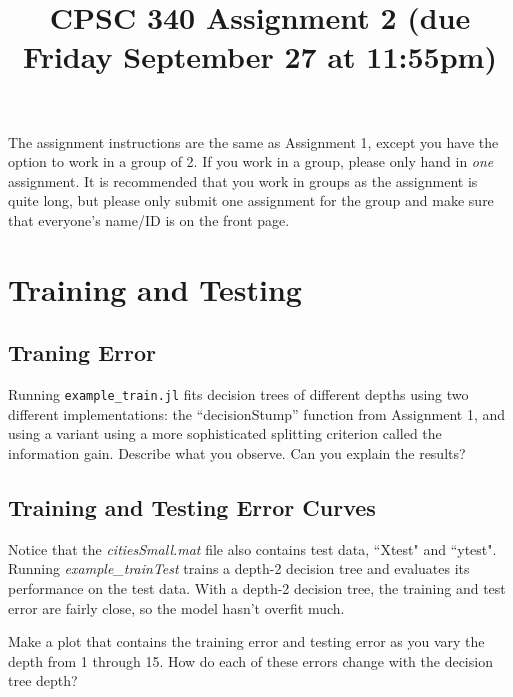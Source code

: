 \documentclass{article}
\def\blu#1{{\color{blu}#1}}
\begin{document}
\title{CPSC 340 Assignment 2 (due Friday September 27 at 11:55pm)}
\author{}
\date{}
\maketitle
\vspace{-4em}

The assignment instructions are the same as Assignment 1, except you have the option to work in a group of 2. If you work in a group, please only hand in \emph{one} assignment. It is recommended that you work in groups as the assignment is quite long, but please only submit one assignment for the group and make sure that everyone's name/ID is on the front page.



\section{Training and Testing}

\subsection{Traning Error}

Running \texttt{example\_train.jl} fits decision trees of different depths using two different implementations:
the ``decisionStump'' function from Assignment 1, and using a variant using a more sophisticated splitting criterion called the information gain. \blu{Describe what you observe. Can you explain the results?}



\subsection{Training and Testing Error Curves}

Notice that the \emph{citiesSmall.mat} file also contains test data, ``Xtest" and ``ytest". 
Running \emph{example\_trainTest} trains a depth-2 decision tree and evaluates its performance on the test data. %
With a depth-2 decision tree, the training and test error are fairly close, so the model hasn't overfit much.


\blu{Make a plot that contains the training error and testing error as you vary the depth from 1 through 15. How do each of these errors change with the decision tree depth?}
\end{document}
